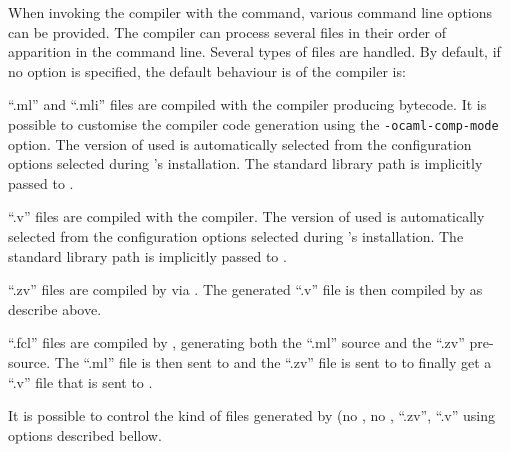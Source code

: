 \label{compiler-options}
When invoking the {\focal} compiler with the {\focalizec} command,
various command line options can be provided. The compiler can process
several files in their order of apparition in the command line.
Several types of files are handled. By default, if no option is
specified, the default behaviour is of the compiler is:
\begin{compact-itemize}
  \item ``.ml'' and ``.mli'' files are compiled with the {\ocaml}
    compiler producing bytecode. It is possible to customise the
    compiler code generation using the {\tt -ocaml-comp-mode} option.
    The version of {\ocaml} used is automatically selected from the
    configuration options selected during {\focal}'s
    installation. The {\focal} standard library path is implicitly
    passed to {\ocaml}.
    \item ``.v'' files are compiled with the {\coq} compiler. The
      version of {\coq} used is automatically selected from the
      configuration options selected during {\focal}'s installation.
      The {\focal} standard library path is implicitly passed to
      {\coq}.
    \item ``.zv'' files are compiled by {\zenon} via {\zvtov}. The
      generated ``.v'' file is then compiled by {\coq} as describe
      above.
    \item ``.fcl'' files are compiled by {\focalizec}, generating both
      the ``.ml'' {\ocaml} source and the ``.zv'' pre-{\coq} source. The
      ``.ml'' file is then sent to {\ocaml} and the ``.zv'' file is sent
      to {\zenon} to finally get a ``.v'' file that is sent to {\coq}.
\end{compact-itemize}
It is possible to control the kind of files generated by
{\focalizec} (no {\coq}, no {\ocaml}, ``.zv'', ``.v'' using options
described bellow.

